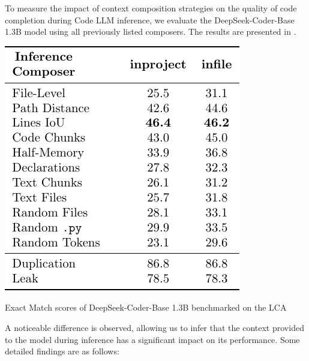 To measure the impact of context composition strategies on the quality of code completion during Code LLM inference, we evaluate the DeepSeek-Coder-Base 1.3B model \parencite{guo2024} using all previously listed composers. The results are presented in .

\begin{table}[htbp]
    \centering
    \includegraphics{tables/rq-a1.pdf}
    \caption{Exact Match scores of DeepSeek-Coder-Base 1.3B benchmarked on the LCA}\label{tab:dseek-inference}
\end{table}

A noticeable difference is observed, allowing us to infer that the context provided to the model during inference has a significant impact on its performance. Some detailed findings are as follows:

